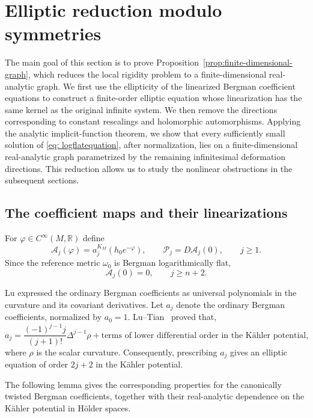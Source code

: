 \documentclass[11pt,reqno]{amsart}
\theoremstyle{corollary}
\theoremstyle{conjecture}
\theoremstyle{assumption}
\theoremstyle{proposition}
\theoremstyle{remark}
\numberwithin{equation}{section}
\begin{document}
\section{Elliptic reduction modulo symmetries}
\label{sec:elliptic-reduction}

The main goal of this section is to prove Proposition~\ref{prop:finite-dimensional-graph}, which reduces the local rigidity problem to a finite-dimensional real-analytic graph. We first use the ellipticity of the linearized Bergman coefficient equations to construct a finite-order elliptic equation whose linearization has the same kernel as the original infinite system. We then remove the directions corresponding to constant rescalings and holomorphic automorphisms. Applying the analytic implicit-function theorem, we show that every sufficiently small solution of \eqref{eq: logflatequation}, after normalization, lies on a finite-dimensional real-analytic graph parametrized by the remaining infinitesimal deformation directions. This reduction allows us to study the nonlinear obstructions in the subsequent sections.

\subsection{The coefficient maps and their linearizations}
\label{subsec:coefficient-maps}

For $\varphi\in C^{\infty}(M,\mathbb R)$ define
\begin{equation}\label{eq:coefficient-equation}
\mathcal A_j(\varphi)=a^{K_M}_j(h_0e^{-\varphi}),\qquad\mathcal P_j=D\mathcal A_j(0),\qquad j\geq1.
\end{equation}
Since the reference metric $\omega_0$ is Bergman logarithmically flat,
\[
\mathcal A_j(0)=0,\qquad j\geq n+2.
\]

Lu \cite[Theorem~1.1]{Lu2000} expressed the ordinary Bergman coefficients as universal polynomials in the curvature and its covariant derivatives. Let $a_j$ denote the ordinary Bergman coefficients, normalized by $a_0=1$. Lu--Tian~\cite[Theorem~3.1]{LuTian2004} proved that,
\[
a_j=\frac{(-1)^{j-1}j}{(j+1)!}\Delta^{j-1}\rho +\text{terms of lower differential order in the K\"ahler potential},
\]
where $\rho$ is the scalar curvature. Consequently, prescribing $a_j$ gives an elliptic equation of order $2j+2$ in the K\"ahler potential.

The following lemma gives the corresponding properties for the canonically twisted Bergman coefficients, together with their real-analytic dependence on the K\"ahler potential in H\"older spaces.
\end{document}
